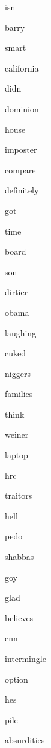 \documentclass[varwidth]{standalone}
\begin{document}
\begin{CJK*}{UTF8}{gbsn}
{{{\colorbox{red!9.742948532104492}{\strut isn}
\colorbox{red!11.91795539855957}{\strut barry}
\colorbox{red!4.940860748291016}{\strut smart}
\colorbox{red!9.945096015930176}{\strut california}
\colorbox{red!3.559286117553711}{\strut didn}
\colorbox{red!10.252022743225098}{\strut dominion}
\colorbox{red!7.9524030685424805}{\strut house}
\colorbox{red!12.752516746520996}{\strut imposter}
\colorbox{red!2.9023261070251465}{\strut compare}
\colorbox{red!8.911398887634277}{\strut definitely}
\colorbox{red!10.514643669128418}{\strut got}
\colorbox{red!4.581355094909668}{\strut time}
\colorbox{red!5.8467535972595215}{\strut board}
\colorbox{red!5.41535758972168}{\strut son}
\colorbox{red!7.311699867248535}{\strut dirtier}
\colorbox{red!8.925714492797852}{\strut obama}
\colorbox{red!2.4404373168945312}{\strut laughing}
\colorbox{red!9.50808048248291}{\strut cuked}
\colorbox{red!11.339032173156738}{\strut niggers}
\colorbox{red!5.582952499389648}{\strut families}
\colorbox{red!5.66193151473999}{\strut think}
\colorbox{red!5.396817207336426}{\strut weiner}
\colorbox{red!1.9710416793823242}{\strut laptop}
\colorbox{red!9.071304321289062}{\strut hrc}
\colorbox{red!11.249690055847168}{\strut traitors}
\colorbox{red!5.891069412231445}{\strut hell}
\colorbox{red!10.968973159790039}{\strut pedo}
\colorbox{red!5.626996040344238}{\strut shabbas}
\colorbox{red!11.288301467895508}{\strut goy}
\colorbox{red!9.599955558776855}{\strut glad}
\colorbox{red!1.3960609436035156}{\strut believes}
\colorbox{red!10.722646713256836}{\strut cnn}
\colorbox{red!12.309751510620117}{\strut intermingle}
\colorbox{red!5.304093360900879}{\strut option}
\colorbox{red!10.840198516845703}{\strut hes}
\colorbox{red!3.8656578063964844}{\strut pile}
\colorbox{red!8.61917781829834}{\strut absurdities}

}}}
\end{CJK*}
\end{document}

